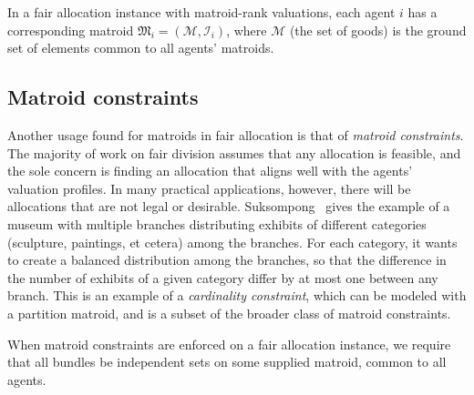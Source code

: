 In a fair allocation instance with matroid-rank valuations, each agent $i$ has a corresponding matroid $\mathfrak{M}_i = (\mathcal{M}, \mathcal{I}_i)$, where $\mathcal{M}$ (the set of goods) is the ground set of elements common to all agents' matroids.


\subsection{Matroid constraints}
Another usage found for matroids in fair allocation is that of \textit{matroid constraints}. The majority of work on fair division assumes that any allocation is feasible, and the sole concern is finding an allocation that aligns well with the agents' valuation profiles. In many practical applications, however, there will be allocations that are not legal or desirable. Suksompong~\cite{suksumpong-constraints} gives the example of a museum with multiple branches distributing exhibits of different categories (sculpture, paintings, et cetera) among the branches. For each category, it wants to create a balanced distribution among the branches, so that the difference in the number of exhibits of a given category differ by at most one between any branch. This is an example of a \textit{cardinality constraint}, which can be modeled with a partition matroid, and is a subset of the broader class of matroid constraints. 

When matroid constraints are enforced on a fair allocation instance, we require that all bundles be independent sets on some supplied matroid, common to all agents. 